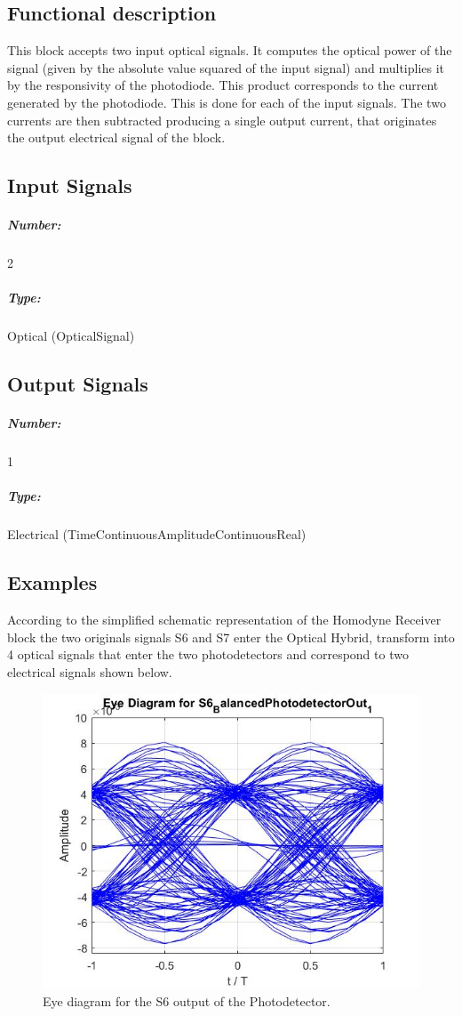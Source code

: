 \subsection*{Functional description}

This block accepts two input optical signals. It computes the optical power of the signal (given by the absolute value squared of the input signal) and multiplies it by the responsivity of the photodiode. This product corresponds to the current generated by the photodiode. This is done for each of the input signals. The two currents are then subtracted producing a single output current, that originates the output electrical signal of the block.

\subsection*{Input Signals}

\subparagraph*{Number:} 2

\subparagraph*{Type:} Optical (OpticalSignal)

\subsection*{Output Signals}

\subparagraph*{Number:} 1

\subparagraph*{Type:} Electrical (TimeContinuousAmplitudeContinuousReal)


\subsection*{Examples}

According to the simplified schematic representation of the Homodyne Receiver block the two originals signals S6 and S7 enter the Optical Hybrid, transform into 4 optical signals that enter the two photodetectors and correspond to two electrical signals shown below.

\begin{figure}[h]
	\centering
	\includegraphics[width=\textwidth]{./lib/photodiode/figures/S6_BalancedPhotodetectorOut_1_EyeDiagram}
	\caption{Eye diagram for the S6 output of the Photodetector.}
\end{figure}

